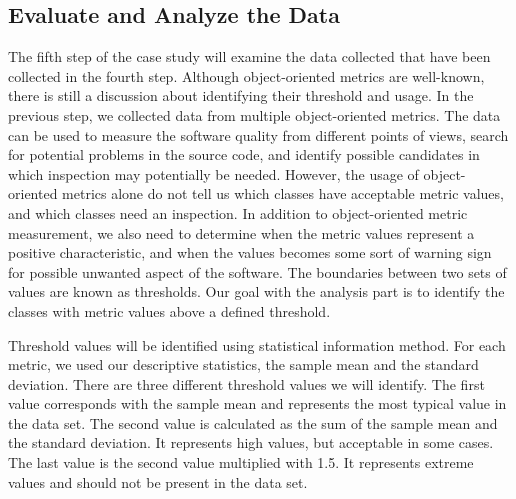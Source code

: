 \subsection{Evaluate and Analyze the Data}
The fifth step of the case study will examine the data collected that have been collected in the fourth step. Although object-oriented metrics are well-known, there is still a discussion about identifying their threshold and usage\cite{tarcisio}. In the previous step, we collected data from multiple object-oriented metrics. The data can be used to measure the software quality from different points of views, search for potential problems in the source code, and identify possible candidates in which inspection may potentially be needed. However, the usage of object-oriented metrics alone do not tell us which classes have acceptable metric values, and which classes need an inspection. In addition to object-oriented metric measurement, we also need to determine when the metric values represent a positive characteristic, and when the values becomes some sort of warning sign for possible unwanted aspect of the software. The boundaries between two sets of values are known as thresholds\cite{ferreira2012identifying}. Our goal with the analysis part is to identify the classes with metric values above a defined threshold.  

Threshold values will be identified using statistical information method\cite{lanza2007object}. For each metric, we used our descriptive statistics, the sample mean and the standard deviation. There are three different threshold values we will identify. The first value corresponds with the sample mean and represents the most typical value in the data set. The second value is calculated as the sum of the sample mean and the standard deviation. It represents high values, but acceptable in some cases. The last value is the second value multiplied with 1.5\cite{lanza2007object}. It represents extreme values and should not be present in the data set.

